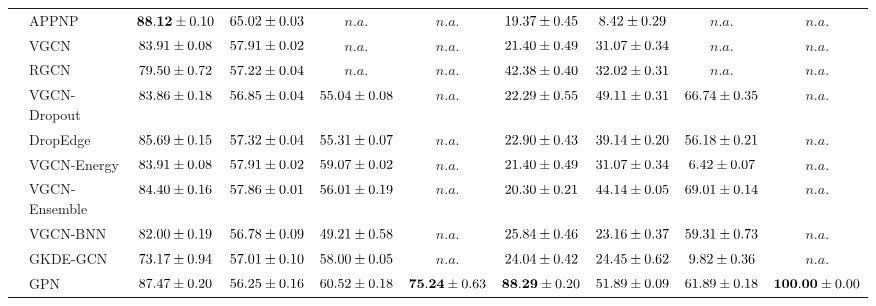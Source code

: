\begin{table*}[!h]
{\begin{tabular}{ll|cccc|cccc}
        \midrule
        
        & APPNP & ${\mathbf{88.12}\tiny \pm 0.10}$ & ${{65.02}\tiny \pm 0.03}$ & $n.a.$ & $n.a.$ & ${19.37\tiny \pm 0.45}$ & ${8.42\tiny \pm 0.29}$ & $n.a.$ & $n.a.$\\
        & VGCN & ${83.91\tiny \pm 0.08}$ & ${57.91\tiny \pm 0.02}$ & $n.a.$ & $n.a.$ & ${21.40\tiny \pm 0.49}$ & ${31.07\tiny \pm 0.34}$ & $n.a.$ & $n.a.$\\
        & RGCN & ${79.50\tiny \pm 0.72}$ & ${57.22\tiny \pm 0.04}$ & $n.a.$ & $n.a.$ & ${42.38\tiny \pm 0.40}$ & ${32.02\tiny \pm 0.31}$ & $n.a.$ & $n.a.$\\
        & VGCN-Dropout & ${83.86\tiny \pm 0.18}$ & ${56.85\tiny \pm 0.04}$ & ${55.04\tiny \pm 0.08}$ & $n.a.$ & ${22.29\tiny \pm 0.55}$ & ${49.11\tiny \pm 0.31}$ & ${66.74\tiny \pm 0.35}$ & $n.a.$\\
        & DropEdge & ${85.69\tiny \pm 0.15}$ & ${57.32\tiny \pm 0.04}$ & ${55.31\tiny \pm 0.07}$ & $n.a.$ & ${22.90\tiny \pm 0.43}$ & ${39.14\tiny \pm 0.20}$ & ${56.18\tiny \pm 0.21}$ & $n.a.$\\
        & VGCN-Energy & ${83.91\tiny \pm 0.08}$ & ${57.91\tiny \pm 0.02}$ & ${59.07\tiny \pm 0.02}$ & $n.a.$ & ${21.40\tiny \pm 0.49}$ & ${31.07\tiny \pm 0.34}$ & ${6.42\tiny \pm 0.07}$ & $n.a.$\\
        & VGCN-Ensemble & ${84.40\tiny \pm 0.16}$ & ${57.86\tiny \pm 0.01}$ & ${56.01\tiny \pm 0.19}$ & $n.a.$ & ${20.30\tiny \pm 0.21}$ & ${44.14\tiny \pm 0.05}$ & ${69.01\tiny \pm 0.14}$ & $n.a.$\\
        & VGCN-BNN & ${82.00\tiny \pm 0.19}$ & ${56.78\tiny \pm 0.09}$ & ${49.21\tiny \pm 0.58}$ & $n.a.$ & ${25.84\tiny \pm 0.46}$ & ${23.16\tiny \pm 0.37}$ & ${59.31\tiny \pm 0.73}$ & $n.a.$\\
        & GKDE-GCN & ${73.17\tiny \pm 0.94}$ & ${57.01\tiny \pm 0.10}$ & ${58.00\tiny \pm 0.05}$ & $n.a.$ & ${24.04\tiny \pm 0.42}$ & ${24.45\tiny \pm 0.62}$ & ${9.82\tiny \pm 0.36}$ & $n.a.$\\
        & GPN & ${87.47\tiny \pm 0.20}$ & ${56.25\tiny \pm 0.16}$ & ${60.52\tiny \pm 0.18}$ & ${\mathbf{75.24}\tiny \pm 0.63}$ & ${\mathbf{88.29}\tiny \pm 0.20}$ & ${51.89\tiny \pm 0.09}$ & ${61.89\tiny \pm 0.18}$ & ${\mathbf{100.00}\tiny \pm 0.00}$\\


\end{tabular}}
\end{table*}
